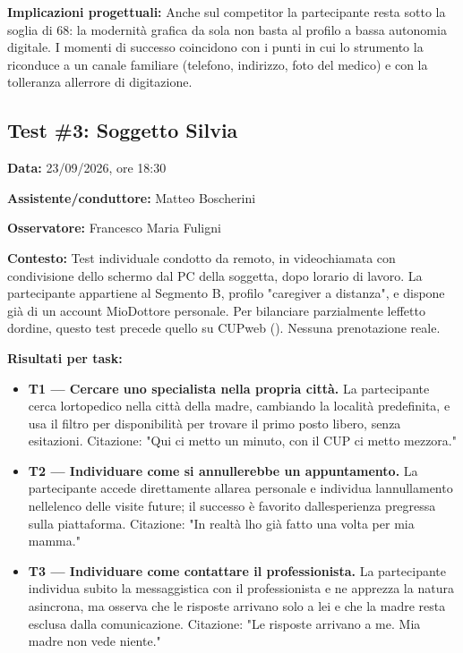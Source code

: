 \textbf{Implicazioni progettuali:} Anche sul competitor la
partecipante resta sotto la soglia di 68: la modernità grafica da sola
non basta al profilo a bassa autonomia digitale. I momenti di successo
coincidono con i punti in cui lo strumento la riconduce a un canale
familiare (telefono, indirizzo, foto del medico) e con la tolleranza
all\textquotesingle errore di digitazione.

\subsection{Test \#3: Soggetto Silvia}

\textbf{Data:} 23/09/2026, ore 18:30

\textbf{Assistente/conduttore:} Matteo Boscherini

\textbf{Osservatore:} Francesco Maria Fuligni

\textbf{Contesto:} Test individuale condotto da remoto, in
videochiamata con condivisione dello schermo dal PC della soggetta,
dopo l\textquotesingle orario di lavoro. La partecipante appartiene
al Segmento B, profilo "caregiver a distanza", e dispone già di un
account MioDottore personale. Per bilanciare parzialmente
l\textquotesingle effetto d\textquotesingle ordine, questo test
precede quello su CUPweb (). Nessuna prenotazione reale.

\textbf{Risultati per task:}

\begin{itemize}
\item
  \textbf{T1 --- Cercare uno specialista nella propria città.}
  La partecipante cerca
  l\textquotesingle ortopedico nella città della madre, cambiando la
  località predefinita, e usa il filtro per disponibilità per trovare
  il primo posto libero, senza esitazioni. Citazione: "Qui ci metto un
  minuto, con il CUP ci metto mezz\textquotesingle ora."
\item
  \textbf{T2 --- Individuare come si annullerebbe un appuntamento.}
  La partecipante accede
  direttamente all\textquotesingle area personale e individua
  l\textquotesingle annullamento nell\textquotesingle elenco delle
  visite future; il successo è favorito dall\textquotesingle esperienza
  pregressa sulla piattaforma. Citazione: "In realtà l\textquotesingle ho
  già fatto una volta per mia mamma."
\item
  \textbf{T3 --- Individuare come contattare il professionista.}
  La partecipante individua
  subito la messaggistica con il professionista e ne apprezza la
  natura asincrona, ma osserva che le risposte arrivano solo a lei e
  che la madre resta esclusa dalla comunicazione. Citazione: "Le
  risposte arrivano a me. Mia madre non vede niente."
\end{itemize}

